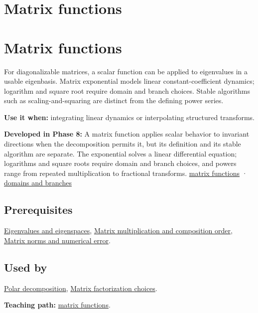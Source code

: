 \hypertarget{appendix-0f4bc2bf2b1f}{}
\section*{Matrix functions}
\section{Matrix functions}\label{appendix-0f4bc2bf2b1f-matrix-functions}

For diagonalizable matrices, a scalar function can be applied to eigenvalues in a usable eigenbasis. Matrix exponential models linear constant-coefficient dynamics; logarithm and square root require domain and branch choices. Stable algorithms such as scaling-and-squaring are distinct from the defining power series.

\textbf{Use it when:} integrating linear dynamics or interpolating structured transforms.

\textbf{Developed in Phase 8:} A matrix function applies scalar behavior to invariant directions when the decomposition permits it, but its definition and its stable algorithm are separate. The exponential solves a linear differential equation; logarithms and square roots require domain and branch choices, and powers range from repeated multiplication to fractional transforms. \hyperref[02-foundations-ii-ch026-matrix-functions-turn-repeated-linear-actions-into-one-operator]{matrix functions} · \hyperref[02-foundations-ii-ch026-logarithms-and-square-roots-need-domains-and-branches]{domains and branches}

\subsection{Prerequisites}\label{appendix-0f4bc2bf2b1f-prerequisites}

\hyperref[appendix-0b3be18411f9]{Eigenvalues and eigenspaces}, \hyperref[appendix-ab31ef447dbf]{Matrix multiplication and composition order}, \hyperref[appendix-f8657bac66e5]{Matrix norms and numerical error}.

\subsection{Used by}\label{appendix-0f4bc2bf2b1f-used-by}

\hyperref[appendix-73f5bcf7a462]{Polar decomposition}, \hyperref[appendix-221a483bec2d]{Matrix factorization choices}.

\textbf{Teaching path:} \hyperref[02-foundations-ii-ch026-matrix-functions-turn-repeated-linear-actions-into-one-operator]{matrix functions}.
